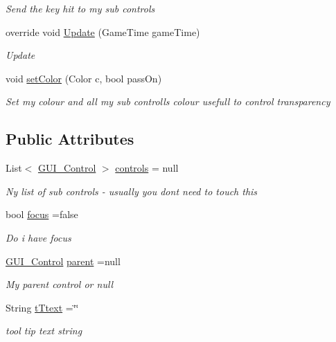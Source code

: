 \begin{DoxyCompactItemize}
\begin{DoxyCompactList}\small\item\em Send the key hit to my sub controls \end{DoxyCompactList}\item 
override void \mbox{\hyperlink{class_r_c___framework_1_1_g_u_i___control_a7aa3b0b6ba141d995ca830ff99ae3003}{Update}} (Game\+Time game\+Time)
\begin{DoxyCompactList}\small\item\em Update \end{DoxyCompactList}\item 
void \mbox{\hyperlink{class_r_c___framework_1_1_g_u_i___control_a19b896ae0239a880458192de438e217c}{set\+Color}} (Color c, bool pass\+On)
\begin{DoxyCompactList}\small\item\em Set my colour and all my sub controlls colour usefull to control transparency \end{DoxyCompactList}\end{DoxyCompactItemize}
\subsection*{Public Attributes}
\begin{DoxyCompactItemize}
\item 
List$<$ \mbox{\hyperlink{class_r_c___framework_1_1_g_u_i___control}{G\+U\+I\+\_\+\+Control}} $>$ \mbox{\hyperlink{class_r_c___framework_1_1_g_u_i___control_a38f8a94f8ae576e42dbce0c043ee31fb}{controls}} = null
\begin{DoxyCompactList}\small\item\em Ny list of sub controls -\/ usually you dont need to touch this \end{DoxyCompactList}\item 
bool \mbox{\hyperlink{class_r_c___framework_1_1_g_u_i___control_a51a1c0b4ed5abd5322dd3975d28c9cec}{focus}} =false
\begin{DoxyCompactList}\small\item\em Do i have focus \end{DoxyCompactList}\item 
\mbox{\hyperlink{class_r_c___framework_1_1_g_u_i___control}{G\+U\+I\+\_\+\+Control}} \mbox{\hyperlink{class_r_c___framework_1_1_g_u_i___control_ac1d70b73574da322d588be9d890a5167}{parent}} =null
\begin{DoxyCompactList}\small\item\em My parent control or null \end{DoxyCompactList}\item 
String \mbox{\hyperlink{class_r_c___framework_1_1_g_u_i___control_a815044c81674b4e0f31124e9dc66978b}{t\+Ttext}} =\char`\"{}\char`\"{}
\begin{DoxyCompactList}\small\item\em tool tip text string \end{DoxyCompactList}\end{DoxyCompactItemize}
